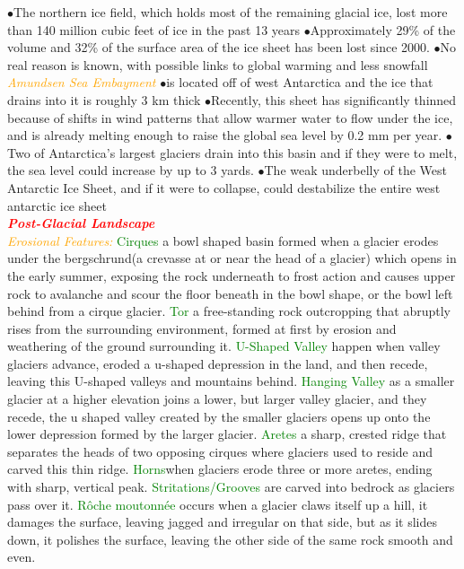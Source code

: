 \documentclass{article}
\newcommand{\ddd}{$\bullet$}
\newcommand{\red}[1]{\textcolor{red}{#1}}
\newcommand{\green}[1]{\textcolor{green}{#1}}
\newcommand{\orange}[1]{\textcolor{orange}{#1}}
\newcommand{\mysection}[1]{\\ \textbf{\textit{\red{#1}}} \\}
\newcommand{\mysub}[1]{{\textit{\orange{#1}}}}
\newcommand{\mysubsub}[1]{{{\green{#1}}}}
\begin{document}
\begin{multicols*}{4}
                \ddd The northern ice field, which holds most of the remaining glacial ice, lost more than 140 million cubic feet of ice in the past 13 years
                \ddd Approximately 29\% of the volume and 32\% of the surface area of the ice sheet has been lost since 2000.
                \ddd No real reason is known, with possible links to global warming and less snowfall
            \mysub{Amundsen Sea Embayment}
                \ddd is located off of west Antarctica and the ice that drains into it is roughly 3 km thick
                \ddd Recently, this sheet has significantly thinned because of shifts in wind patterns that allow warmer water to flow under the ice, and is already melting enough to raise the global sea level by 0.2 mm per year. 
                \ddd Two of Antarctica's largest glaciers drain into this basin and if they were to melt, the sea level could increase by up to 3 yards. 
                \ddd The weak underbelly of the West Antarctic Ice Sheet, and if it were to collapse, could destabilize the entire west antarctic ice sheet
 	    \mysection{Post-Glacial Landscape}  
 	    \mysub{Erosional Features:}
 	    \mysubsub{Cirques} a bowl shaped basin formed when a glacier erodes under the bergschrund(a crevasse at or near the head of a glacier) which opens in the early summer, exposing the rock underneath to frost action and causes upper rock to avalanche and scour the floor beneath in the bowl shape, or the bowl left behind from a cirque glacier.
 	    \mysubsub{Tor} a free-standing rock outcropping that abruptly rises from the surrounding environment, formed at first by erosion and weathering of the ground surrounding it.
 	    \mysubsub{U-Shaped Valley} happen when valley glaciers advance, eroded a u-shaped depression in the land, and then recede, leaving this U-shaped valleys and mountains behind.
 	    \mysubsub{Hanging Valley} as a smaller glacier at a higher elevation joins a lower, but larger valley glacier, and they recede, the u shaped valley created by the smaller glaciers opens up onto the lower depression formed by the larger glacier.
 	    \mysubsub{Aretes} a sharp, crested ridge that separates the heads of two opposing cirques where glaciers used to reside and carved this thin ridge.
 	    \mysubsub{Horns}when glaciers erode three or more aretes, ending with sharp, vertical peak.
 	    \mysubsub{Stritations/Grooves} are carved into bedrock as glaciers pass over it.
 	    \mysubsub{Rôche moutonnée} occurs when a glacier claws itself up a hill, it damages the surface, leaving jagged and irregular on that side, but as it slides down, it polishes the surface, leaving the other side of the same rock smooth and even.

\end{multicols*}
\end{document}
